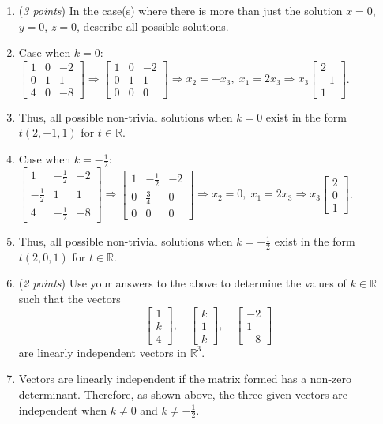 \documentclass[11pt]{article}
\newcommand{\bbR}{\mathbb{R}}
\theoremstyle{definition}
\numberwithin{equation}{subsection}
\begin{document}
\begin{enumerate}
\begin{enumerate}
\item (\emph{3 points}) In the case(s) where there is more than just the solution $x=0$, $y=0$, $z=0$, describe all possible solutions.
\item[] Case when $k=0$: $\begin{bmatrix}1&0&-2\\0&1&1\\4&0&-8\end{bmatrix}\Rightarrow\begin{bmatrix}1&0&-2\\0&1&1\\0&0&0\end{bmatrix}\Rightarrow x_2=-x_3,\; x_1=2x_3\Rightarrow x_3\begin{bmatrix}2\\-1\\1\end{bmatrix}$.
\item[] Thus, all possible non-trivial solutions when $k=0$ exist in the form $t(2,-1,1)$ for $t\in\bbR$.
\item[] Case when $k=-\frac{1}{2}$: $\begin{bmatrix}1&-\frac{1}{2}&-2\\-\frac{1}{2}&1&1\\4&-\frac{1}{2}&-8\end{bmatrix}\Rightarrow\begin{bmatrix}1&-\frac{1}{2}&-2\\0&\frac{3}{4}&0\\0&0&0\end{bmatrix}\Rightarrow x_2=0, \; x_1=2x_3\Rightarrow x_3\begin{bmatrix}2\\0\\1\end{bmatrix}$.
\item[] Thus, all possible non-trivial solutions when $k=-\frac{1}{2}$ exist in the form $t(2,0,1)$ for $t\in\bbR$.

\item (\emph{2 points}) Use your answers to the above to determine the values of $k\in\mathbb{R}$ such that the vectors
$$\begin{bmatrix} 1\\ k\\ 4\end{bmatrix}, \quad \begin{bmatrix} k\\ 1\\ k\end{bmatrix}, \quad \begin{bmatrix} -2\\ 1\\ -8\end{bmatrix}$$
are linearly independent vectors in $\mathbb{R}^3$.
\item[] Vectors are linearly independent if the matrix formed has a non-zero determinant. Therefore, as shown above, the three given vectors are independent when $k\neq0$ and $k\neq -\frac{1}{2}$.


\end{enumerate}
\end{enumerate}
\end{document}
